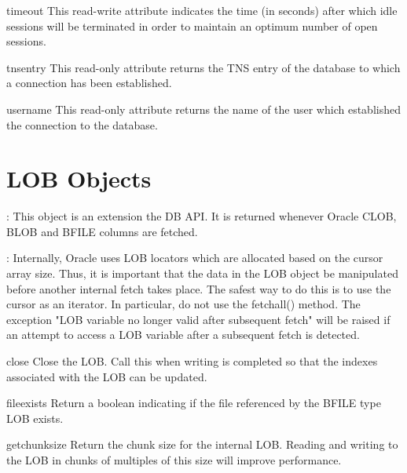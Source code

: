 \documentclass{manual}
\begin{document}
\begin{datadesc}{timeout}
  This read-write attribute indicates the time (in seconds) after which idle
  sessions will be terminated in order to maintain an optimum number of open
  sessions.
\end{datadesc}

\begin{datadesc}{tnsentry}
  This read-only attribute returns the TNS entry of the database to which a
  connection has been established.
\end{datadesc}

\begin{datadesc}{username}
  This read-only attribute returns the name of the user which established the
  connection to the database.
\end{datadesc}

\chapter{LOB Objects\label{lobobj}}

: This object is an extension the DB API. It is returned whenever
Oracle CLOB, BLOB and BFILE columns are fetched.

: Internally, Oracle uses LOB locators which are allocated based
on the cursor array size. Thus, it is important that the data in the LOB object
be manipulated before another internal fetch takes place. The safest way to do
this is to use the cursor as an iterator. In particular, do not use the
fetchall() method. The exception "LOB variable no longer valid after
subsequent fetch" will be raised if an attempt to access a LOB variable after
a subsequent fetch is detected.

\begin{funcdesc}{close}{}
  Close the LOB. Call this when writing is completed so that the indexes
  associated with the LOB can be updated.
\end{funcdesc}
\begin{funcdesc}{fileexists}{}
  Return a boolean indicating if the file referenced by the BFILE type LOB
  exists.
\end{funcdesc}

\begin{funcdesc}{getchunksize}{}
  Return the chunk size for the internal LOB. Reading and writing to the LOB
  in chunks of multiples of this size will improve performance.
\end{funcdesc}
\end{document}

